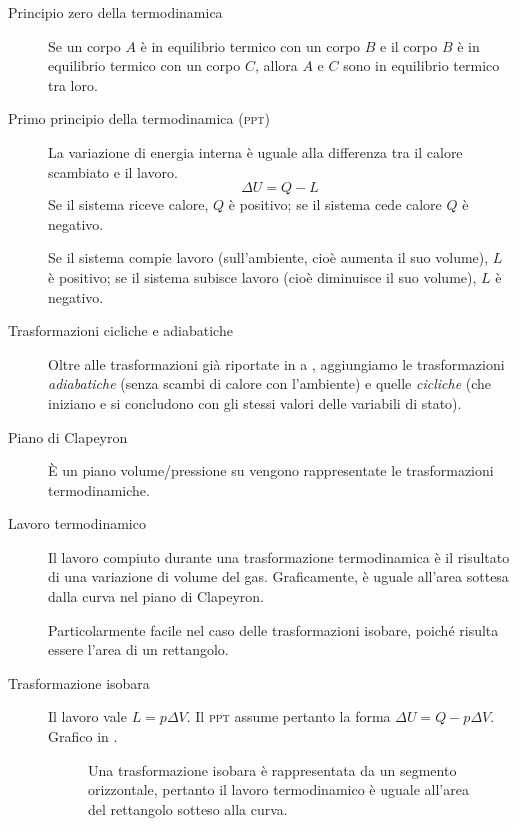 \documentclass[a4paper,11pt,italian]{article}
\begin{document}
\begin{description}
  \item[Principio zero della termodinamica] 
  Se un corpo $ A $ è in equilibrio termico con un corpo $ B $ e il corpo $ B $ è in equilibrio termico con un corpo $ C $, allora $ A $ e $ C $ sono in equilibrio termico tra loro.
  
  \item[Primo principio della termodinamica (\textsc{ppt})] 
  La variazione di energia interna è uguale alla differenza tra il calore scambiato e il lavoro.
  \[ \Delta U = Q - L \]
  Se il sistema riceve calore, $ Q $ è positivo; se il sistema cede calore $ Q $ è negativo.
  
  Se il sistema compie lavoro (sull'ambiente, cioè aumenta il suo volume), $ L $ è positivo; se il sistema subisce lavoro (cioè diminuisce il suo volume), $ L $ è negativo.
  
  \item[Trasformazioni cicliche e adiabatiche] 
  Oltre alle trasformazioni già riportate in  a , aggiungiamo le trasformazioni \emph{adiabatiche} (senza scambi di calore con l'ambiente) e quelle \emph{cicliche} (che iniziano e si concludono con gli stessi valori delle variabili di stato).
  
  \item[Piano di Clapeyron] 
  È un piano volume/pressione su vengono rappresentate le trasformazioni termodinamiche.
  
  \item[Lavoro termodinamico] 
  Il lavoro compiuto durante una trasformazione termodinamica è il risultato di una variazione di volume del gas. Graficamente, è uguale all'area sottesa dalla curva nel piano di Clapeyron.
  
  Particolarmente facile nel caso delle trasformazioni isobare, poiché risulta essere l'area di un rettangolo.
  
  \item[Trasformazione isobara] 
  Il lavoro vale $ L = p \Delta V $. Il \textsc{ppt} assume pertanto la forma $ \Delta U = Q - p \Delta V $. Grafico in .
  
\begin{figure}[htp]\centering

\caption{Una trasformazione isobara è rappresentata da un segmento orizzontale, pertanto il lavoro termodinamico è uguale all'area del rettangolo sotteso alla curva.}
\label{img:isobara}
\end{figure}
  

\end{description}
\end{document}
